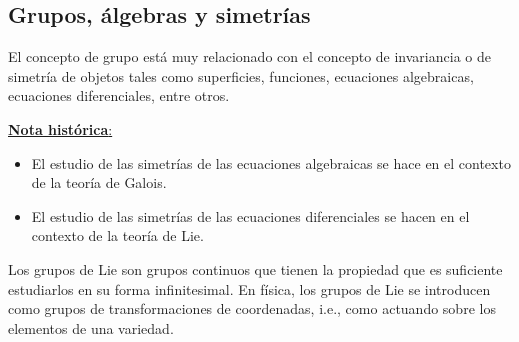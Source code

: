 \subsection{Grupos, álgebras y simetrías}
El concepto de grupo está muy relacionado con el concepto de invariancia o de simetría de objetos tales como superficies, funciones, ecuaciones algebraicas, ecuaciones diferenciales, entre otros.

\underline{\textbf{Nota histórica}: }
\begin{itemize}
	\item El estudio de las simetrías de las ecuaciones algebraicas se hace en el contexto de la teoría de Galois.
	\item El estudio de las simetrías de las ecuaciones diferenciales se hacen en el contexto de la teoría de Lie.
\end{itemize}

Los grupos de Lie son grupos continuos que tienen la propiedad que es suficiente estudiarlos en su forma infinitesimal. En física, los grupos de Lie se introducen como grupos de transformaciones de coordenadas, i.e., como actuando sobre los elementos de una variedad.


